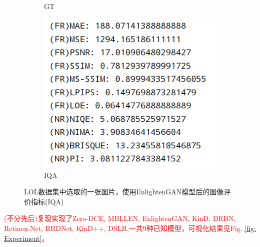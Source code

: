 \documentclass[a4paper, 10pt]{article}
\begin{document}
\begin{figure}[htb]
\begin{subfigure}{0.19\textwidth}
				\captionsetup{font=scriptsize}
				\caption{GT}
				\label{fig: GT}
			\end{subfigure}
			\begin{subfigure}{0.19\textwidth}
				\includegraphics[width=\linewidth]{picture/LLIE/EnlightenGAN/Index}
				\captionsetup{font=scriptsize}
				\caption{IQA}
				\label{fig:IQA}
			\end{subfigure}
			\caption{
				\label{fig: IQA Index}
				LOL数据集中选取的一张图片，使用EnlightenGAN模型后的图像评价指标(IQA)
			}
		\end{figure}
		
		\textcolor{red}{(不分先后)复现实现了Zero-DCE\cite{guo2020zero}, MBLLEN\cite{lv2018mbllen}, EnlightenGAN\cite{jiang2021enlightengan}, KinD\cite{zhang2019kindling}, DRBN\cite{yang2020fidelity}, Retinex-Net\cite{wei2018deep}, RRDNet\cite{zhu2020zero}, KinD++\cite{zhang2021beyond}, DSLR\cite{lim2020dslr},一共9种已知模型，可视化结果见Fig. \ref{fig: Experiment}。}
	
\end{document}
